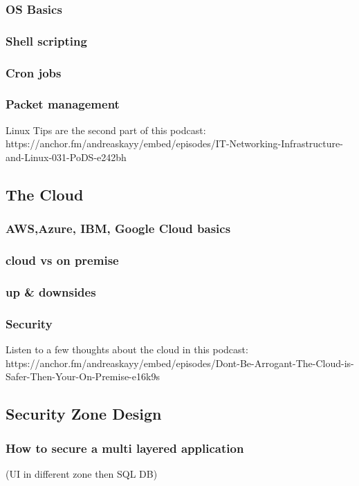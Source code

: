 \documentclass[12pt]{scrartcl} %
\begin{document}
\subsubsection{OS Basics}

\subsubsection{Shell scripting}

\subsubsection{Cron jobs}

\subsubsection{Packet management}
Linux Tips are the second part of this podcast: https://anchor.fm/andreaskayy/embed/episodes/IT-Networking-Infrastructure-and-Linux-031-PoDS-e242bh

\subsection{The Cloud}

\subsubsection{AWS,Azure, IBM, Google Cloud basics}
\subsubsection{cloud vs on premise}
\subsubsection{up \& downsides}
\subsubsection{Security}

Listen to a few thoughts about the cloud in this podcast: https://anchor.fm/andreaskayy/embed/episodes/Dont-Be-Arrogant-The-Cloud-is-Safer-Then-Your-On-Premise-e16k9s


\subsection{Security Zone Design}
\subsubsection{How to secure a multi layered application}
(UI in different zone then SQL DB)
\end{document}
